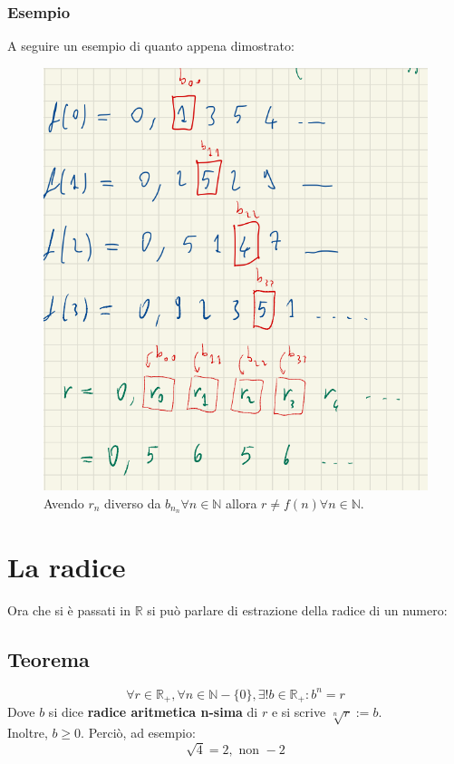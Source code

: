 \documentclass[12pt]{article}
\begin{document}
\subsubsection{Esempio}
A seguire un esempio di quanto appena dimostrato:
\begin{figure}[!htb]
    \centering
    \includegraphics[width=1\textwidth, height=.9\textheight,keepaspectratio]{lezione_4/dim_numerab_r.PNG} %
    \begin{center}
        \caption{\label{fig:dim_numerab_r_example}Avendo $r_n$ diverso da $b_{n_n} \forall n \in \mathbb{N}$ allora $r \not= f(n) \forall n \in \mathbb{N}$.} %
    \end{center}
\end{figure}
\section{La radice}
Ora che si è passati in $\mathbb{R}$ si può parlare di estrazione della radice di un numero:
\subsection{Teorema}
\begin{equation}
    \forall r \in \mathbb{R_+}, \forall n \in \mathbb{N} - \{0\}, \exists ! b \in \mathbb{R_+} : b^n = r \label{teo:estrazione_radice}
\end{equation}
Dove $b$ si dice \textbf{radice aritmetica n-sima} di $r$ e si scrive $\sqrt[n]{r} := b$.\\
Inoltre, $b \geq 0$. Perciò, ad esempio:
\[\sqrt{4} = 2, \text{ non } -2\]
\end{document}
